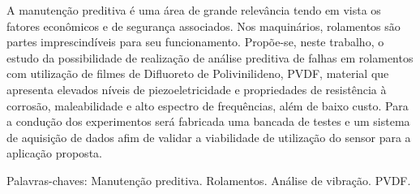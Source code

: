 \documentclass[
	12pt,				
	oneside,			
	a4paper,			
	english,			
	brazil				
	]{abntex2ppgsi}
\begin{document}
\frenchspacing 



\imprimircapa

\imprimirfolhaderosto




\setlength{\absparsep}{18pt} %
\begin{resumo}



A manutenção preditiva é uma área de grande relevância tendo em vista os fatores econômicos e de segurança associados. Nos maquinários, rolamentos são partes imprescindíveis para seu funcionamento. Propõe-se, neste trabalho, o estudo da possibilidade de realização de análise preditiva de falhas em rolamentos com utilização de filmes de Difluoreto de Polivinilideno, PVDF, material que apresenta elevados níveis de piezoeletricidade e propriedades de resistência à corrosão, maleabilidade e alto espectro de frequências, além de baixo custo. Para a condução dos experimentos será fabricada uma bancada de testes e um sistema de aquisição de dados afim de validar a viabilidade de utilização do sensor para a aplicação proposta. 

Palavras-chaves: Manutenção preditiva. Rolamentos. Análise de vibração. PVDF.
\end{resumo}

\end{document}
